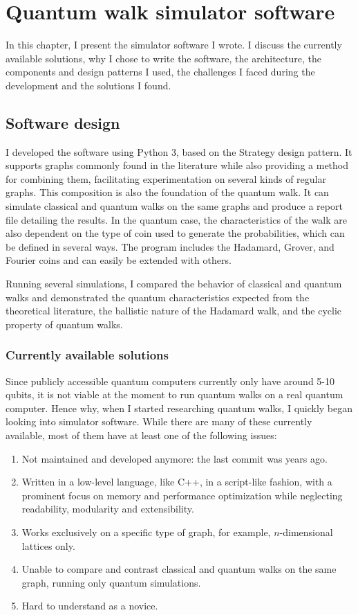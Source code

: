 \chapter{Quantum walk simulator software}

In this chapter, I present the simulator software I wrote. I discuss the currently available solutions, why I chose to write the software, the architecture, the components and design patterns I used, the challenges I faced during the development and the solutions I found.

\section{Software design}

I developed the software using Python 3, based on the Strategy design pattern. It supports graphs commonly found in the literature while also providing a method for combining them, facilitating experimentation on several kinds of regular graphs. This composition is also the foundation of the quantum walk. It can simulate classical and quantum walks on the same graphs and produce a report file detailing the results. In the quantum case, the characteristics of the walk are also dependent on the type of coin used to generate the probabilities, which can be defined in several ways. The program includes the Hadamard, Grover, and Fourier coins and can easily be extended with others.

Running several simulations, I compared the behavior of classical and quantum walks and demonstrated the quantum characteristics expected from the theoretical literature, the ballistic nature of the Hadamard walk, and the cyclic property of quantum walks.

\subsection{Currently available solutions}

Since publicly accessible quantum computers currently only have around 5-10 qubits, it is not viable at the moment to run quantum walks on a real quantum computer. Hence why, when I started researching quantum walks, I quickly began looking into simulator software. While there are many of these currently available, most of them have at least one of the following issues:

\begin{enumerate}
\item Not maintained and developed anymore: the last commit was years ago.
\item Written in a low-level language, like C++, in a script-like fashion, with a prominent focus on memory and performance optimization while neglecting readability, modularity and extensibility.
\item Works exclusively on a specific type of graph, for example, $n$-dimensional lattices only.
\item Unable to compare and contrast classical and quantum walks on the same graph, running only quantum simulations.
\item Hard to understand as a novice.
\end{enumerate}

